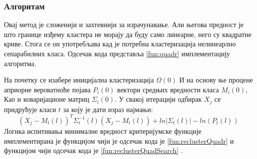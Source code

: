 \subsubsection{Алгоритам}
Овај метод је сложенији и захтевнији за израчунавање. Али његова предност је што границе изђему кластера не морају да буду само линеарне, него су квадратне криве. Стога се он употребљава кад је потребна кластеризација нелинеарлно сепарабилних класа. 
Одсечак кода представља \ref{fun:quadr} имплементацију алгоритма.

На почетку се изабере иницијална кластеризација $\Omega(0)$ И на основу ње процене априорне вероватноће појава $P_i(0)$ вектори средњих вредности класа $M_i(0)$, Као и коваријационе матриц $\Sigma_i(0)$. У свакој итерацији одбирак $X_j$ се придрућује класи $t$ за коју је дати израз најмањи:
$$(X_j - M_t(l))^T\Sigma_t^{-1}(l)(X_j-M_t(l)) + ln|\Sigma_t(l)| - ln(P_t(l))$$
Логика испитивања минималне вредност критеријумске функције имплементирана је функцијом чији је одсечак кода је  \ref{fun:reclusterQuadr} и функцијом чији одсечак кода је \ref{fun:reclusterQuadSearch} .

